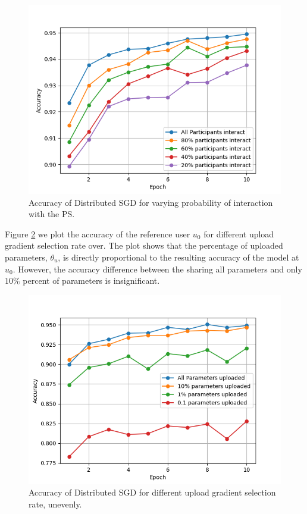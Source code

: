 \documentclass[letterpaper]{article}
\begin{document}
\begin{flushleft}
{\begin{figure}[H]
  \centering
    \includegraphics[width=5in]{VaryingProbabilityInteractionGrid.png}
    \caption[SGD for varying probability of interaction.]{\label{fig:VaryingProbabilityInteraction} Accuracy of Distributed SGD for varying probability of interaction with the PS.}
  \end{figure}




Figure \ref{fig:VaryingThetaU} we plot the accuracy of the reference user $u_0$ for different upload gradient selection rate over. 
The plot shows that the percentage of uploaded parameters, $\theta_u$, is directly proportional to the resulting accuracy of
the model at $u_0$. However, the accuracy difference between the sharing all parameters and only $ 10\% $ percent of parameters is
insignificant.

\begin{figure}[H]
  \centering
    \includegraphics[width=5in]{VaryingThetaUGrid.png}
    \caption[Varying upload gradient selection rate]{\label{fig:VaryingThetaU}Accuracy of Distributed SGD for different upload gradient selection rate, unevenly.}
  \end{figure}


}
\end{flushleft}
\end{document}
